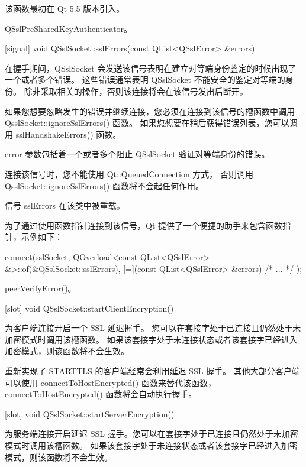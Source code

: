 该函数最初在 Qt 5.5 版本引入。

\begin{seeAlso}
QSslPreSharedKeyAuthenticator。
\end{seeAlso}

[signal] void QSslSocket::sslErrors(const QList<QSslError> \&errors)

在握手期间，QSslSocket 会发送该信号表明在建立对等端身份鉴定的时候出现了一个或者多个错误。
这些错误通常表明 QSslSocket 不能安全的鉴定对等端的身份。
除非采取相关的操作，否则该连接将会在该信号发出后断开。

如果您想要忽略发生的错误并继续连接，您必须在连接到该信号的槽函数中调用 QsslSocket::ignoreSslErrors() 函数。
如果您想要在稍后获得错误列表，您可以调用 sslHandshakeErrors() 函数。

error 参数包括着一个或者多个阻止 QSslSocket 验证对等端身份的错误。

\begin{notice}
连接该信号时，您不能使用 Qt::QueuedConnection 方式，
否则调用 QsslSocket::ignoreSslErrors() 函数将不会起任何作用。
\end{notice}

\begin{notice}
信号 sslErrors 在该类中被重载。
\end{notice}

为了通过使用函数指针连接到该信号，Qt 提供了一个便捷的助手来包含函数指针，示例如下：

\begin{cppcode}
connect(sslSocket, QOverload<const QList<QSslError> &>::of(&QSslSocket::sslErrors),
     [=](const QList<QSslError> &errors){ /* ... */ });
\end{cppcode}

\begin{seeAlso}
peerVerifyError()。
\end{seeAlso}

[slot] void QSslSocket::startClientEncryption()

为客户端连接开启一个 SSL 延迟握手。
您可以在套接字处于已连接且仍然处于未加密模式时调用该槽函数。
如果该套接字处于未连接状态或者该套接字已经进入加密模式，则该函数将不会生效。

重新实现了 STARTTLS 的客户端经常会利用延迟 SSL 握手。
其他大部分客户端可以使用 connectToHostEncrypted() 函数来替代该函数，
connectToHostEncrypted() 函数将会自动执行握手。

[slot] void QSslSocket::startServerEncryption()

为服务端连接开启延迟 SSL 握手。您可以在套接字处于已连接且仍然处于未加密模式时调用该槽函数。
如果该套接字处于未连接状态或者该套接字已经进入加密模式，则该函数将不会生效。

